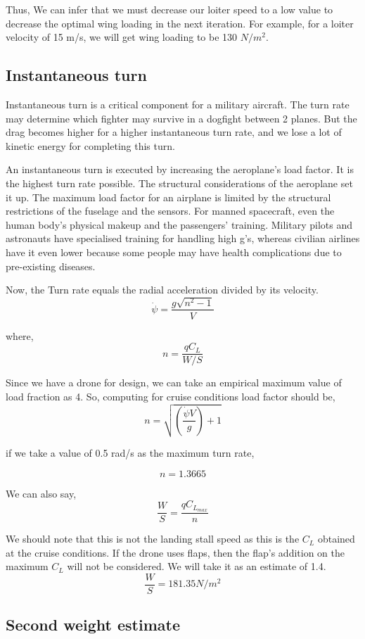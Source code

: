 \documentclass[12 pt]{article}
\begin{document}
Thus, We can infer that we must decrease our loiter speed to a low value to decrease the optimal wing loading in the next iteration. For example, for a loiter velocity of 15 m/s, we will get wing loading to be 130 $N/m^2$.

\subsection{Instantaneous turn}

Instantaneous turn is a critical component for a military aircraft. The turn rate may determine which fighter may survive in a dogfight between 2 planes. But the drag becomes higher for a higher instantaneous turn rate, and we lose a lot of kinetic energy for completing this turn. 

An instantaneous turn is executed by increasing the aeroplane's load factor. It is the highest turn rate possible. The structural considerations of the aeroplane set it up. The maximum load factor for an airplane is limited by the structural restrictions of the fuselage and the sensors. For manned spacecraft, even the human body's physical makeup and the passengers' training. Military pilots and astronauts have specialised training for handling high g's, whereas civilian airlines have it even lower because some people may have health complications due to pre-existing diseases. 

Now, the Turn rate equals the radial acceleration divided by its velocity.
$$ \dot{\psi} = \frac{g \sqrt{n^2 -1}}{V} $$

where, $$ n = \frac{q C_L}{W/S}$$

Since we have a drone for design, we can take an empirical maximum value of load fraction as 4. So, computing for cruise conditions load factor should be, 
$$ n = \sqrt{ \left( \frac{\dot{\psi}V}{g} \right) +1 } $$

if we take a value of 0.5 rad/s as the maximum turn rate, 

$$ n = 1.3665 $$

We can also say,
$$ \frac{W}{S} = \frac{q C_{L_{max}}}{n} $$

We should note that this is not the landing stall speed as this is the $C_L$ obtained at the cruise conditions. If the drone uses flaps, then the flap's addition on the maximum $C_L$ will not be considered. We will take it as an estimate of 1.4.
$$ \frac{W}{S} = 181.35 N/m^2 $$ 

\subsection{{Second weight estimate}}
\end{document}
